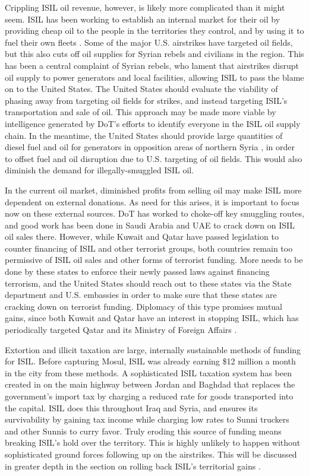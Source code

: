 \documentclass{report}
\begin{document}
Crippling ISIL oil revenue, however, is likely more complicated than it might seem. ISIL has been working to establish an internal market for their oil by providing cheap oil to the people in the territories they control, and by using it to fuel their own fleets \cite{Lister2014}. Some of the major U.S. airstrikes have targeted oil fields, but this also cuts off oil supplies for Syrian rebels and civilians in the region. This has been a central complaint of Syrian rebels, who lament that airstrikes disrupt oil supply to power generators and local facilities, allowing ISIL to pass the blame on to the United States. The United States should evaluate the viability of phasing away from targeting oil fields for strikes, and instead targeting ISIL's transportation and sale of oil. This approach may be made more viable by intelligence generated by DoT's efforts to identify everyone in the ISIL oil supply chain. In the meantime, the United States should provide large quantities of diesel fuel and oil for generators in opposition areas of northern Syria \cite{Lister2014}, in order to offset fuel and oil disruption due to U.S. targeting of oil fields. This would also diminish the demand for illegally-smuggled ISIL oil.

In the current oil market, diminished profits from selling oil may make ISIL more dependent on external donations. As need for this arises, it is important to focus now on these external sources. DoT has worked to choke-off key smuggling routes, and good work has been done in Saudi Arabia and UAE to crack down on ISIL oil sales there. However, while Kuwait and Qatar have passed legislation to counter financing of ISIL and other terrorist groups, both countries remain too permissive of ISIL oil sales and other forms of terrorist funding. More needs to be done by these states to enforce their newly passed laws against financing terrorism, and the United States should reach out to these states via the State department and U.S. embassies in order to make sure that these states are cracking down on terrorist funding. Diplomacy of this type promises mutual gains, since both Kuwait and Qatar have an interest in stopping ISIL, which has periodically targeted Qatar and its Ministry of Foreign Affairs \cite{Lister2014}.

Extortion and illicit taxation are large, internally sustainable methods of funding for ISIL. Before capturing Mosul, ISIL was already earning \$12 million a month in the city from these methods. A sophisticated ISIL taxation system has been created in on the main highway between Jordan and Baghdad that replaces the government's import tax by charging a reduced rate for goods transported into the capital. ISIL does this throughout Iraq and Syria, and ensures its survivability by gaining tax income while charging low rates to Sunni truckers and other Sunnis to curry favor. Truly eroding this source of funding means breaking ISIL's hold over the territory. This is highly unlikely to happen without sophisticated ground forces following up on the airstrikes. This will be discussed in greater depth in the section on rolling back ISIL's territorial gains \cite{Lister2014}.
\end{document}
